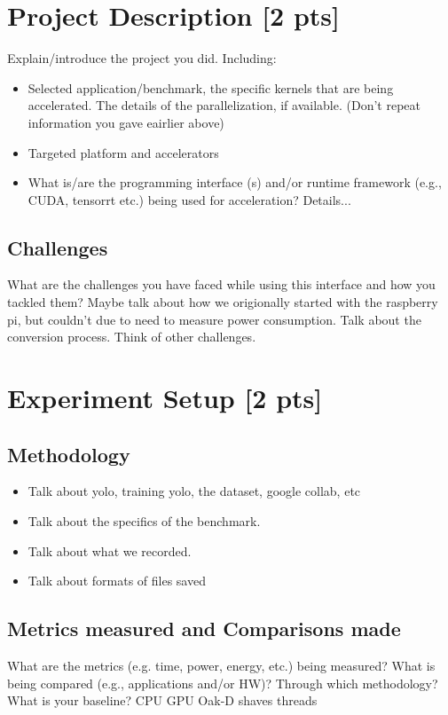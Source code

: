\documentclass[sigconf,authorversion,nonacm]{acmart}
\begin{document}
\section{Project Description  {\small {[2 pts]}}}
Explain/introduce the project you did. Including: 
\begin{itemize}
    \item Selected application/benchmark, the specific kernels that are being accelerated. The details of the parallelization, if available. (Don't repeat information you gave eairlier above)
    \item Targeted platform and accelerators
    \item What is/are the programming interface (s) and/or runtime framework (e.g., CUDA, tensorrt etc.) being used for acceleration? Details...
\end{itemize}

\subsection{Challenges}
What are the challenges you have faced  while using this interface and how you tackled them?
Maybe talk about how we origionally started with the raspberry pi, but couldn't due to need to measure power consumption. Talk about the conversion process. Think of other challenges.

\section{Experiment Setup  {\small {[2 pts]}}}

\subsection{Methodology}  
\begin{itemize}
    \item Talk about yolo, training yolo, the dataset, google collab, etc
    \item Talk about the specifics of the benchmark.
    \item Talk about what we recorded.
    \item Talk about formats of files saved
\end{itemize}

\subsection{Metrics measured and Comparisons made}
What are the metrics (e.g. time, power, energy, etc.) being measured? What is being compared (e.g., applications and/or HW)? Through which methodology? What is your baseline?
CPU GPU Oak-D shaves threads
\end{document}
